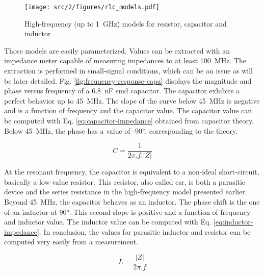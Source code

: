 \begin{figure}[!h]
  \centering
  \texttt{[image: src/2/figures/rlc\_models.pdf]}
  \caption{High-frequency (up to \SI{1}{\giga\hertz}) models for resistor, capacitor and inductor}
  \label{fig:rlc-esd-models}
\end{figure}

Those models are easily parameterized.
Values can be extracted with an impedance meter capable of measuring impedances to at least \SI{100}{\mega\hertz}.
The extraction is performed in small-signal conditions, which can be an issue as will be later detailed.
Fig. \ref{fig:frequency-response-capa} displays the magnitude and phase versus frequency of a \SI{6.8}{\nano\farad} \gls{smd} capacitor.
The capacitor exhibits a perfect behavior up to \SI{45}{\mega\hertz}.
The slope of the curve below \SI{45}{\mega\hertz} is negative and is a function of frequency and the capacitor value.
The capacitor value can be computed with Eq. \ref{eq:capacitor-impedance} obtained from capacitor theory.
Below \SI{45}{\mega\hertz}, the phase has a value of \ang{-90}, corresponding to the theory.

\begin{equation}
C = \frac{1}{2\pi .f.\lvert Z \rvert}
\label{eq:capacitor-impedance}
\end{equation}

At the resonant frequency, the capacitor is equivalent to a non-ideal short-circuit, basically a low-value resistor.
This resistor, also called \gls{esr}, is both a parasitic device and the series resistance in the high-frequency model presented earlier.
Beyond \SI{45}{\mega\hertz}, the capacitor behaves as an inductor.
The phase shift is the one of an inductor at \ang{+90}.
This second slope is positive and a function of frequency and inductor value.
The inductor value can be computed with Eq. \ref{eq:inductor-impedance}.
In conclusion, the values for parasitic inductor and resistor can be computed very easily from a measurement.

\begin{equation}
L = \frac{\lvert Z \rvert}{2\pi .f}
\label{eq:inductor-impedance}
\end{equation}

